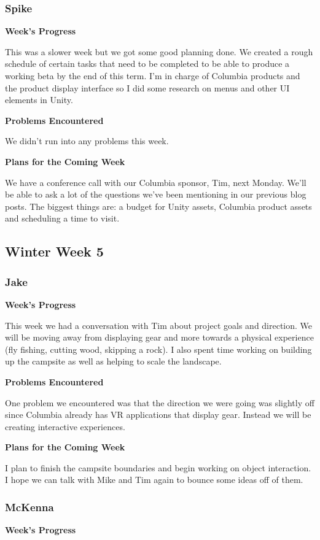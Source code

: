 \documentclass[10pt,journal,compsoc,onecolumn, draftclsnofoot]{IEEEtran}
\begin{document}
\subsubsection{Spike}
\noindent \textbf{Week's Progress}

This was a slower week but we got some good planning done. We created a rough schedule of certain tasks that need to be completed to be able to produce a working beta by the end of this term. I'm in charge of Columbia products and the product display interface so I did some research on menus and other UI elements in Unity.

\noindent \textbf{Problems Encountered}

We didn't run into any problems this week.

\noindent \textbf{Plans for the Coming Week}

We have a conference call with our Columbia sponsor, Tim, next Monday. We'll be able to ask a lot of the questions we've been mentioning in our previous blog posts. The biggest things are: a budget for Unity assets, Columbia product assets and scheduling a time to visit.

\subsection{Winter Week 5}
\subsubsection{Jake}
\noindent \textbf{Week's Progress}

This week we had a conversation with Tim about project goals and direction. We will be moving away from displaying gear and more towards a physical experience (fly fishing, cutting wood, skipping a rock). I also spent time working on building up the campsite as well as helping to scale the landscape.

\noindent \textbf{Problems Encountered}

One problem we encountered was that the direction we were going was slightly off since Columbia already has VR applications that display gear. Instead we will be creating interactive experiences.

\noindent \textbf{Plans for the Coming Week}

I plan to finish the campsite boundaries and begin working on object interaction. I hope we can talk with Mike and Tim again to bounce some ideas off of them.

\subsubsection{McKenna}
\noindent \textbf{Week's Progress}
\end{document}
